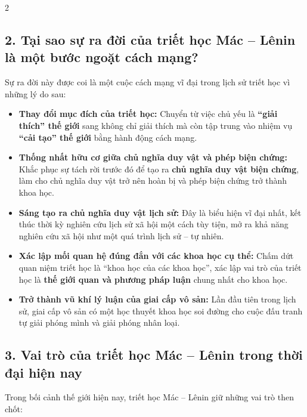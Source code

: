 \documentclass[9pt,a4paper]{extarticle}
\begin{document}
\begin{multicols*}{2}
\subsection*{2. Tại sao sự ra đời của triết học Mác -- Lênin là một bước ngoặt cách mạng?}

Sự ra đời này được coi là một cuộc cách mạng vĩ đại trong lịch sử triết học vì những lý do sau:

\begin{itemize}
\item \textbf{Thay đổi mục đích của triết học:} Chuyển từ việc chủ yếu là \textbf{``giải thích'' thế giới} sang không chỉ giải thích mà còn tập trung vào nhiệm vụ \textbf{``cải tạo'' thế giới} bằng hành động cách mạng.
\item \textbf{Thống nhất hữu cơ giữa chủ nghĩa duy vật và phép biện chứng:} Khắc phục sự tách rời trước đó để tạo ra \textbf{chủ nghĩa duy vật biện chứng}, làm cho chủ nghĩa duy vật trở nên hoàn bị và phép biện chứng trở thành khoa học.
\item \textbf{Sáng tạo ra chủ nghĩa duy vật lịch sử:} Đây là biểu hiện vĩ đại nhất, kết thúc thời kỳ nghiên cứu lịch sử xã hội một cách tùy tiện, mở ra khả năng nghiên cứu xã hội như một quá trình lịch sử -- tự nhiên.
\item \textbf{Xác lập mối quan hệ đúng đắn với các khoa học cụ thể:} Chấm dứt quan niệm triết học là ``khoa học của các khoa học'', xác lập vai trò của triết học là \textbf{thế giới quan và phương pháp luận} chung nhất cho khoa học.
\item \textbf{Trở thành vũ khí lý luận của giai cấp vô sản:} Lần đầu tiên trong lịch sử, giai cấp vô sản có một học thuyết khoa học soi đường cho cuộc đấu tranh tự giải phóng mình và giải phóng nhân loại.
\end{itemize}

\subsection*{3. Vai trò của triết học Mác -- Lênin trong thời đại hiện nay}

Trong bối cảnh thế giới hiện nay, triết học Mác -- Lênin giữ những vai trò then chốt:


\end{multicols*}
\end{document}
